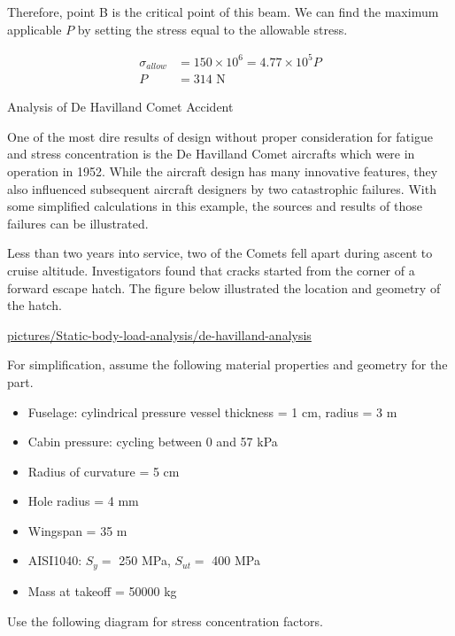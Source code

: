 \documentclass[a4paper,openany,12pt]{book}
\begin{document}
Therefore, point B is the critical point of this beam. We can find the
maximum applicable \(P\) by setting the stress equal to the allowable
stress.

$$\begin{aligned}
    \sigma_{allow} &= 150 \times 10^6 = 4.77 \times 10^5 P \\
    P &= 314 \text{ N}
  \end{aligned}$$

Analysis of De Havilland Comet Accident

One of the most dire results of design without proper consideration for
fatigue and stress concentration is the De Havilland Comet aircrafts
which were in operation in 1952. While the aircraft design has many
innovative features, they also influenced subsequent aircraft designers
by two catastrophic failures. With some simplified calculations in this
example, the sources and results of those failures can be illustrated.

Less than two years into service, two of the Comets fell apart during
ascent to cruise altitude. Investigators found that cracks started from
the corner of a forward escape hatch. The figure below illustrated the
location and geometry of the hatch.


\url{pictures/Static-body-load-analysis/de-havilland-analysis}

For simplification, assume the following material properties and
geometry for the part.

\begin{itemize}
\item Fuselage: cylindrical pressure vessel thickness = 1 cm, radius = 3 m

\item Cabin pressure: cycling between 0 and 57 kPa

\item Radius of curvature = 5 cm

\item Hole radius = 4 mm

\item Wingspan = 35 m

\item AISI1040: \(S_y =\) 250 MPa, \(S_{ut} =\) 400 MPa

\item Mass at takeoff = 50000 kg
\end{itemize}

Use the following diagram for stress concentration factors.
\end{document}
